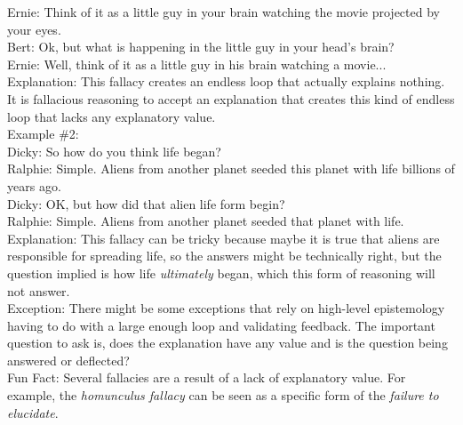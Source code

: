 \documentclass[a4paper,12pt,single,pdftex]{scrartcl}
\begin{document}
    
      Ernie: Think of it as a little guy in your brain watching the movie projected by your eyes.
    \\

    
      Bert: Ok, but what is happening in the little guy in your head’s brain?
    \\

    
      Ernie: Well, think of it as a little guy in his brain watching a movie...
    \\

    
      Explanation: This fallacy creates an endless loop that actually explains nothing.  It is fallacious reasoning to accept an explanation that creates this kind of endless loop that lacks any explanatory value.
    \\

    
      Example \#2:
    \\

    
      Dicky: So how do you think life began?
    \\

    
      Ralphie: Simple.  Aliens from another planet seeded this planet with life billions of years ago.
    \\

    
      Dicky: OK, but how did that alien life form begin?
    \\

    
      Ralphie: Simple.  Aliens from another planet seeded that planet with life.
    \\

    
      Explanation: This fallacy can be tricky because maybe it is true that aliens are responsible for spreading life, so the answers might be technically right, but the question implied is how life {\it ultimately}  began, which this form of reasoning will not answer.
    \\

    
      Exception: There might be some exceptions that rely on high-level epistemology having to do with a large enough loop and validating feedback.  The important question to ask is, does the explanation have any value and is the question being answered or deflected?
    \\

    
      Fun Fact: Several fallacies are a result of a lack of explanatory value. For example, the {\em homunculus fallacy} can be seen as a specific form of the {\it failure to elucidate}.
    \\
\end{document}
